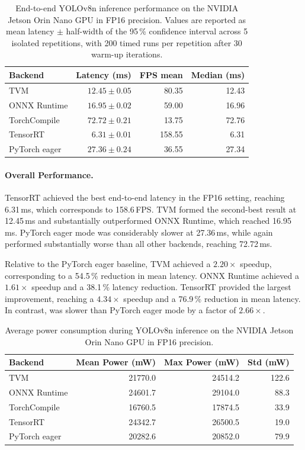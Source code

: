 \documentclass[12pt,a4paper]{report}
\begin{document}
\begin{table}[ht]
\centering
\caption{End-to-end YOLOv8n inference performance on the NVIDIA Jetson Orin Nano GPU in FP16 precision.
Values are reported as mean latency $\pm$ half-width of the 95\,\% confidence
interval across 5 isolated repetitions, with 200 timed runs per repetition
after 30 warm-up iterations.}
\label{tab:orin_fp16_backend_benchmark}
\begin{tabular}{lrrr}
\toprule
Backend & Latency (ms) & FPS mean & Median (ms) \\
\midrule
TVM             & $12.45 \pm 0.05$ & 80.35 & 12.43 \\
ONNX Runtime    & $16.95 \pm 0.02$ & 59.00 & 16.96 \\
TorchCompile    & $72.72 \pm 0.21$ & 13.75 & 72.76 \\
TensorRT        & $6.31 \pm 0.01$  & 158.55 & 6.31 \\
PyTorch eager   & $27.36 \pm 0.24$ & 36.55 & 27.34 \\
\bottomrule
\end{tabular}
\end{table}

\paragraph{Overall Performance.}
TensorRT achieved the best end-to-end latency in the FP16 setting, reaching
6.31\,ms, which corresponds to 158.6\,FPS. TVM formed the second-best result at
12.45\,ms and substantially outperformed ONNX Runtime, which reached 16.95\,ms.
PyTorch eager mode was considerably slower at 27.36\,ms, while
 again performed substantially worse than all other
backends, reaching 72.72\,ms.

Relative to the PyTorch eager baseline, TVM achieved a \(2.20\times\) speedup,
corresponding to a 54.5\,\% reduction in mean latency. ONNX Runtime achieved a
\(1.61\times\) speedup and a 38.1\,\% latency reduction. TensorRT provided the
largest improvement, reaching a \(4.34\times\) speedup and a 76.9\,\%
reduction in mean latency. In contrast,  was slower than
PyTorch eager mode by a factor of \(2.66\times\).

\begin{table}[ht]
\centering
\caption{Average power consumption during YOLOv8n inference on the NVIDIA Jetson
Orin Nano GPU in FP16 precision.}
\label{tab:orin_fp16_backend_power}
\begin{tabular}{lrrr}
\toprule
Backend & Mean Power (mW) & Max Power (mW) & Std (mW) \\
\midrule
TVM             & 21770.0 & 24514.2 & 122.6 \\
ONNX Runtime    & 24601.7 & 29104.0 & 88.3 \\
TorchCompile    & 16760.5 & 17874.5 & 33.9 \\
TensorRT        & 24342.7 & 26500.5 & 19.0 \\
PyTorch eager   & 20282.6 & 20852.0 & 79.9 \\
\bottomrule
\end{tabular}
\end{table}
\end{document}
